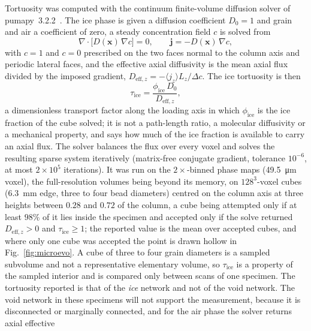 \documentclass[preprint,12pt,numbers]{elsarticle}
\begin{document}
  Tortuosity was computed with the continuum finite-volume diffusion solver
  of pumapy~3.2.2~\cite{Ferguson2021}.  The ice phase is given a diffusion
  coefficient $D_0 = 1$ and grain and air a coefficient of zero, a steady
  concentration field $c$ is solved from
  \begin{equation}
    \nabla\cdot\bigl[D(\mathbf{x})\,\nabla c\bigr] = 0,
    \qquad \mathbf{j} = -D(\mathbf{x})\,\nabla c,
    \label{eq:diff}
  \end{equation}
  with $c = 1$ and $c = 0$ prescribed on the two faces normal to the column
  axis and periodic lateral faces, and the effective axial diffusivity is the
  mean axial flux divided by the imposed gradient,
  $D_{\mathrm{eff},z} = -\langle j_z\rangle L_z/\Delta c$.  The ice tortuosity
  is then
  \begin{equation}
    \tau_\mathrm{ice} = \frac{\phi_\mathrm{ice}\,D_0}{D_{\mathrm{eff},z}},
    \label{eq:tau}
  \end{equation}
  a dimensionless transport factor along the loading axis in which
  $\phi_\mathrm{ice}$ is the ice fraction of the cube solved; it is not a
  path-length ratio, a molecular diffusivity or a mechanical property, and
  says how much of the ice fraction is available to carry an axial flux.  The
  solver balances the flux over every voxel and solves the resulting sparse
  system iteratively (matrix-free conjugate gradient, tolerance $10^{-6}$, at most $2\times10^{5}$
  iterations).  It was run on the $2\times$-binned phase maps
  (\SI{49.5}{\micro\meter} voxel), the full-resolution volumes being beyond
  its memory, on $128^3$-voxel cubes (\SI{6.3}{\milli\meter} edge, three to
  four bead diameters) centred on the column axis at three heights between
  $0.28$ and $0.72$ of the column, a cube being attempted only if at least
  $98\%$ of it lies inside the specimen and accepted only if the solve
  returned $D_{\mathrm{eff},z} > 0$ and $\tau_\mathrm{ice} \geq 1$; the
  reported value is the mean over accepted cubes, and where only one cube was
  accepted the point is drawn hollow in Fig.~\ref{fig:microevo}.  A cube of
  three to four grain diameters is a sampled subvolume and not a
  representative elementary volume, so $\tau_\mathrm{ice}$ is a property of
  the sampled interior and is compared only between scans of one specimen.
  The tortuosity reported is that of the \emph{ice} network and not of the
  void network.  The void network in these specimens
  will not support the measurement, because it is disconnected or marginally
  connected, and for the air phase the solver returns axial effective
\end{document}
